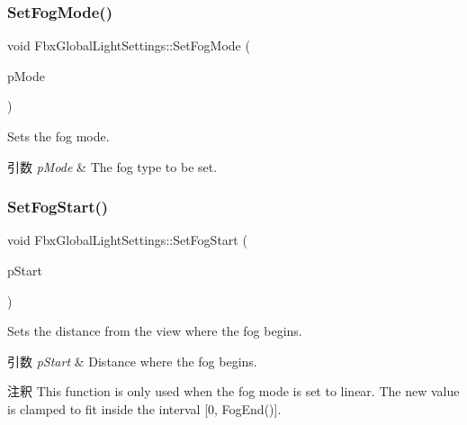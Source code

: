 \subsubsection{\texorpdfstring{Set\+Fog\+Mode()}{SetFogMode()}}
{\footnotesize\ttfamily void Fbx\+Global\+Light\+Settings\+::\+Set\+Fog\+Mode (\begin{DoxyParamCaption}\item[{\hyperlink{class_fbx_global_light_settings_a2d6040cb267cbdb092bdf9fb73de8d6d}{E\+Fog\+Mode}}]{p\+Mode }\end{DoxyParamCaption})}

Sets the fog mode. 
\begin{DoxyParams}{引数}
{\em p\+Mode} & The fog type to be set. \\
\hline
\end{DoxyParams}
\mbox{\label{class_fbx_global_light_settings_a5d8cf2b4c90e5cfedcd2169aa8321ebf}} 
\subsubsection{\texorpdfstring{Set\+Fog\+Start()}{SetFogStart()}}
{\footnotesize\ttfamily void Fbx\+Global\+Light\+Settings\+::\+Set\+Fog\+Start (\begin{DoxyParamCaption}\item[{double}]{p\+Start }\end{DoxyParamCaption})}

Sets the distance from the view where the fog begins. 
\begin{DoxyParams}{引数}
{\em p\+Start} & Distance where the fog begins. \\
\hline
\end{DoxyParams}
\begin{DoxyRemark}{注釈}
This function is only used when the fog mode is set to linear. The new value is clamped to fit inside the interval \mbox{[}0, Fog\+End()\mbox{]}. 
\end{DoxyRemark}
\mbox{\label{class_fbx_global_light_settings_a0e50d74c9f7f9be8446dde2e8c42ea31}} 
